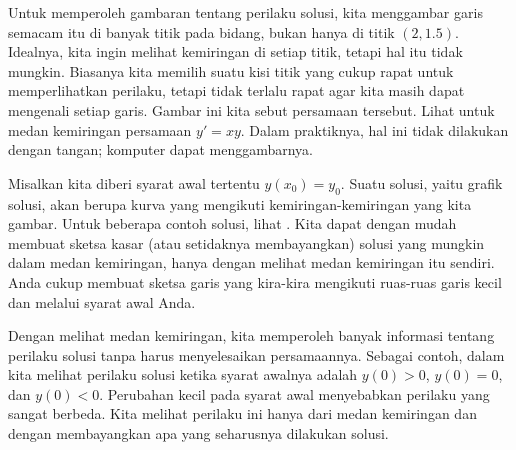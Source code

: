 Untuk memperoleh gambaran tentang perilaku solusi, kita menggambar garis semacam itu di banyak
titik pada bidang, bukan hanya di titik $(2,1.5)$.  Idealnya, kita
ingin melihat kemiringan di setiap titik, tetapi hal itu
tidak mungkin.  Biasanya kita memilih suatu
kisi titik yang cukup rapat untuk memperlihatkan perilaku, tetapi tidak terlalu
rapat agar kita masih dapat mengenali setiap garis.
Gambar ini kita sebut \emph{} persamaan tersebut.
Lihat  untuk medan kemiringan persamaan $y' = xy$.
Dalam praktiknya, hal ini tidak dilakukan dengan tangan; komputer dapat
menggambarnya.

Misalkan kita diberi syarat awal tertentu $y(x_0) = y_0$.
Suatu solusi, yaitu grafik solusi, akan berupa kurva
yang mengikuti kemiringan-kemiringan yang kita gambar.
Untuk beberapa contoh
solusi, lihat .  Kita dapat dengan mudah membuat sketsa kasar
(atau setidaknya membayangkan)
solusi yang mungkin dalam medan kemiringan, hanya dengan melihat medan kemiringan
itu sendiri.  Anda cukup membuat sketsa garis yang kira-kira mengikuti ruas-ruas garis kecil
dan melalui syarat awal Anda.

\begin{myfig}
\parbox[t]{3.0in}{
 \capstart
 \caption{Medan kemiringan $y' = xy$.\label{1.3:fig1}}
}
\quad
\parbox[t]{3.0in}{
 \capstart
 \caption{Medan kemiringan $y' = xy$ dengan grafik solusi yang memenuhi
 $y(0) = 0.2$, $y(0) = 0$, dan $y(0) = -0.2$.\label{1.3:fig2}}
}
\end{myfig}

Dengan melihat medan kemiringan, kita memperoleh banyak informasi
tentang perilaku solusi tanpa harus menyelesaikan
persamaannya.  Sebagai
contoh, dalam  kita melihat perilaku solusi ketika syarat awalnya
adalah $y(0) > 0$, $y(0) = 0$, dan $y(0) < 0$.
Perubahan kecil pada
syarat awal menyebabkan perilaku yang sangat berbeda.
Kita melihat perilaku ini hanya
dari medan kemiringan dan dengan membayangkan apa yang seharusnya dilakukan solusi.


